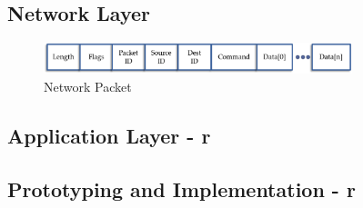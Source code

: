 \subsection{Network Layer}

\begin{figure}[htb]
\centering
\includegraphics[width=0.8\textwidth]{images/network_packet.png}
\caption{Network Packet}
\label{fig:network_packet}
\end{figure}


\subsection{Application Layer - r}

\subsection{Prototyping and Implementation - r}